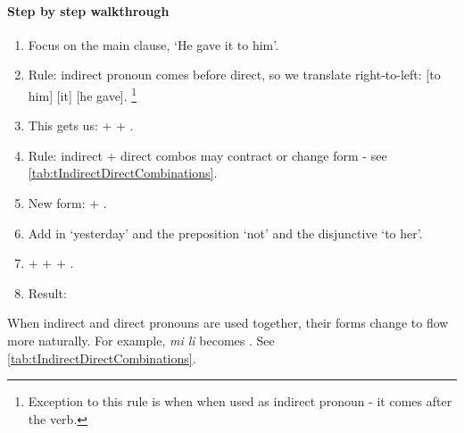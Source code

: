 \paragraph{Step by step walkthrough}
\begin{enumerate}[nosep]
  \item{Focus on the main clause, `He gave it to him'.}
  \item{Rule: indirect pronoun comes before direct, so we translate right-to-left: [to him] [it] [he gave].}
    \footnote{Exception to this rule is when  when used as indirect pronoun - it comes after the verb.}
  \item{This gets us:  +  + .}
  \item{Rule: indirect + direct combos may contract or change form - see \ref{tab:tIndirectDirectCombinations}.}
  \item{New form:  + .}
  \item{Add in `yesterday' and the preposition `not' and the disjunctive `to her'.}
  \item{ +  +  + .}
  \item{Result: }
\end{enumerate}


When indirect and direct pronouns are used together, their forms change to flow more naturally.
For example, \textit{mi li} becomes . See \ref{tab:tIndirectDirectCombinations}.

